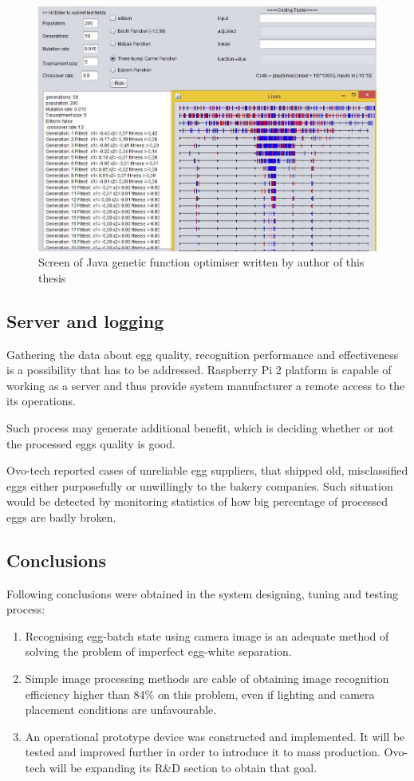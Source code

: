 \documentclass[12pt,twoside,a4paper]{article}
\begin{document}
\begin{figure}[H]
\centering
\includegraphics[width=0.7\paperwidth]{genetic}
\caption{Screen of Java genetic function optimiser written by author of this thesis \cite{morph}}\label{fig:generic}
\end{figure}


\subsection{Server and logging}
Gathering the data about egg quality, recognition performance and effectiveness is a possibility that has to be addressed.
Raspberry Pi 2 platform is capable of working as a server and thus provide system manufacturer a remote access to the its operations.

Such process may generate additional benefit, which is deciding whether or not the processed eggs quality is good.

Ovo-tech reported cases of unreliable egg suppliers, that shipped old, misclassified eggs either purposefully or unwillingly to the bakery companies.
Such situation would be detected by monitoring statistics of how big percentage of processed eggs are badly broken.

\newpage
\subsection{Conclusions}

Following conclusions were obtained in the system designing, tuning and testing process:
\begin{enumerate}
\item Recognising egg-batch state using camera image is an adequate method of solving the problem of imperfect egg-white separation.
\item Simple image processing methods are cable of obtaining image recognition efficiency higher than 84\% on this problem, even if lighting and camera placement conditions are unfavourable.
\item An operational prototype device was constructed and implemented. It will be tested and improved further in order to introduce it to mass production. Ovo-tech will be expanding its R\&D section to obtain that goal.
\end{enumerate}
\end{document}
